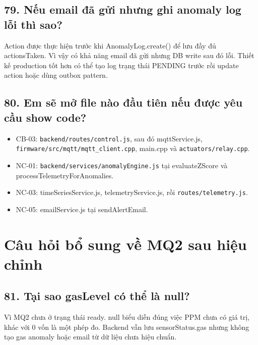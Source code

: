 \documentclass[11pt,oneside,openany]{book}
\renewcommand{\texttt}[1]{{\ttfamily\small #1}}
\providecommand{\tightlist}{\setlength{\itemsep}{1pt}\setlength{\parskip}{0pt}}
\begin{document}
\subsection{79. Nếu email đã gửi nhưng ghi anomaly log lỗi thì
sao?}\label{79-nux1ebfu-email-ux111uxe3-gux1eedi-nhux1b0ng-ghi-anomaly-log-lux1ed7i-thuxec-sao}

Action được thực hiện trước khi \texttt{AnomalyLog.create()} để lưu đầy
đủ \texttt{actionsTaken}. Vì vậy có khả năng email đã gửi nhưng DB write
sau đó lỗi. Thiết kế production tốt hơn có thể tạo log trạng thái
PENDING trước rồi update action hoặc dùng outbox pattern.

\subsection{80. Em sẽ mở file nào đầu tiên nếu được yêu cầu show
code?}\label{80-em-sux1ebd-mux1edf-file-nuxe0o-ux111ux1ea7u-tiuxean-nux1ebfu-ux111ux1b0ux1ee3c-yuxeau-cux1ea7u-show-code}

\begin{itemize}
\tightlist
\item
  CB-03: \nolinkurl{backend/routes/control.js}, sau đó
  \texttt{mqttService.js},
  \nolinkurl{firmware/src/mqtt/mqtt_client.cpp}, \texttt{main.cpp} và
  \nolinkurl{actuators/relay.cpp}.
\item
  NC-01: \nolinkurl{backend/services/anomalyEngine.js} tại
  \texttt{evaluateZScore} và \texttt{processTelemetryForAnomalies}.
\item
  NC-03: \texttt{timeSeriesService.js}, \texttt{telemetryService.js},
  rồi \nolinkurl{routes/telemetry.js}.
\item
  NC-05: \texttt{emailService.js} tại \texttt{sendAlertEmail}.
\end{itemize}

\section{Câu hỏi bổ sung về MQ2 sau hiệu
chỉnh}\label{cuxe2u-hux1ecfi-bux1ed5-sung-vux1ec1-mq2-sau-hiux1ec7u-chux1ec9nh}

\subsection{\texorpdfstring{81. Tại sao \texttt{gasLevel} có thể là
null?}{81. Tại sao gasLevel có thể là null?}}\label{81-tux1ea1i-sao-gaslevel-cuxf3-thux1ec3-luxe0-null}

Vì MQ2 chưa ở trạng thái \texttt{ready}. \texttt{null} biểu diễn đúng
việc PPM chưa có giá trị, khác với \texttt{0} vốn là một phép đo.
Backend vẫn lưu \texttt{sensorStatus.gas} nhưng không tạo gas anomaly
hoặc email từ dữ liệu chưa hiệu chuẩn.
\end{document}
